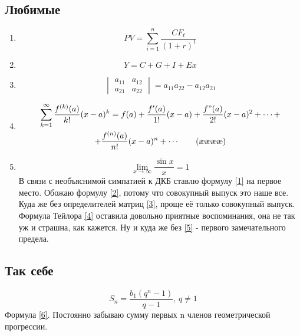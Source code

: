 \documentclass[12pt, a4paper]{article}
\begin{document}
\subsection{Любимые}
\begin{enumerate}
\item \begin{equation}\label{1}
PV=\sum_{i=1}^n\frac{CF_t}{(1+r)^t}\tag{æ}
\end{equation}
\item \begin{equation}\label{2}
Y=C+G+I+Ex \tag{ææ}
\end{equation}



\item \begin{equation} \label{3} \begin{vmatrix}
		a_{11} & a_{12} \\
		a_{21} & a_{22}
	\end{vmatrix} = a_{11}a_{22}-a_{12}a_{21} \tag{æææ}
\end{equation}
\item \begin{multline}\label{4}
\sum_{k=1}^{\infty} \frac{f^{(k)}(a)}{k!} (x-a)^k = f(a) + \frac{f'(a)}{1!} (x-a)+ \frac{f"(a)}{2!} (x-a)^2 + \cdots + \\ +\frac{f^{(n)}(a)}{n!} (x-a)^n+ \cdots \tag{ææææ}
\end{multline}

\item \begin{equation} \label{5}\lim_{x \rightarrow \infty}{\frac{\sin x}{x}}=1 \tag{æææææ}
\end{equation}
В связи с необъяснимой симпатией к ДКБ ставлю формулу \eqref{1} на первое место.
Обожаю формулу \eqref{2}, потому что совокупный выпуск это наше все. Куда же без определителей матриц \eqref{3}, проще её только совокупный выпуск.  Формула Тейлора \eqref{4} оставила довольно приятные воспоминания, она не так уж и страшна, как кажется. Ну и куда же без \eqref{5} - первого замечательного предела.
\end{enumerate}
\subsection{Так себе}
\begin{equation} \label{6} S_n=\frac{b_1(q^n-1)}{q-1}, \, q\neq 1
\tag{ææææææ}
\end{equation}
Формула \eqref{6}. Постоянно забываю сумму первых n членов геометрической прогрессии.
\end{document}
